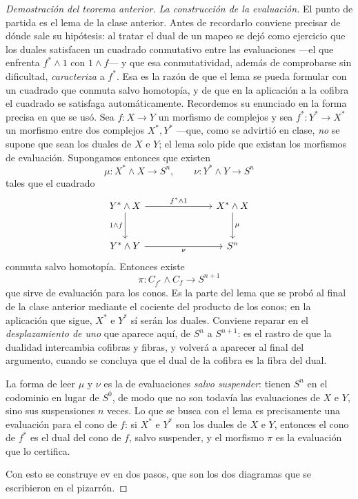 \begin{proof}[Demostración del teorema anterior]
\emph{La construcción de la evaluación.} El punto de partida es el lema de la clase anterior. Antes de recordarlo conviene precisar de dónde sale su hipótesis: al tratar el dual de un mapeo se dejó como ejercicio que los duales satisfacen un cuadrado conmutativo entre las evaluaciones ---el que enfrenta $f^*\wedge1$ con $1\wedge f$--- y que esa conmutatividad, además de comprobarse sin dificultad, \emph{caracteriza} a $f^*$. Esa es la razón de que el lema se pueda formular con un cuadrado que conmuta salvo homotopía, y de que en la aplicación a la cofibra el cuadrado se satisfaga automáticamente. Recordemos su enunciado en la forma precisa en que se usó. Sea $f\colon X\to Y$ un morfismo de complejos y sea $f^*\colon Y^*\to X^*$ un morfismo entre dos complejos $X^*,Y^*$ ---que, como se advirtió en clase, \emph{no} se supone que sean los duales de $X$ e $Y$; el lema solo pide que existan los morfismos de evaluación. Supongamos entonces que existen
\[
\mu\colon X^*\wedge X\longrightarrow S^n ,
\qquad
\nu\colon Y^*\wedge Y\longrightarrow S^n
\]
tales que el cuadrado
\[
\begin{tikzcd}[column sep=7em, row sep=large]
Y^*\wedge X \arrow[r,"f^*\wedge1"] \arrow[d,"1\wedge f"'] & X^*\wedge X \arrow[d,"\mu"]\\
Y^*\wedge Y \arrow[r,"\nu"'] & S^n
\end{tikzcd}
\]
conmuta salvo homotopía. Entonces existe
\[
\pi\colon C_{f^*}\wedge C_f\longrightarrow S^{n+1}
\]
que sirve de evaluación para los conos. Es la parte del lema que se probó al final de la clase anterior mediante el cociente del producto de los conos; en la aplicación que sigue, $X^*$ e $Y^*$ sí serán los duales. Conviene reparar en el \emph{desplazamiento de uno} que aparece aquí, de $S^n$ a $S^{n+1}$: es el rastro de que la dualidad intercambia cofibras y fibras, y volverá a aparecer al final del argumento, cuando se concluya que el dual de la cofibra es la fibra del dual.

La forma de leer $\mu$ y $\nu$ es la de evaluaciones \emph{salvo suspender}: tienen $S^n$ en el codominio en lugar de $S^0$, de modo que no son todavía las evaluaciones de $X$ e $Y$, sino sus suspensiones $n$ veces. Lo que se busca con el lema es precisamente una evaluación para el cono de $f$: si $X^*$ e $Y^*$ son los duales de $X$ e $Y$, entonces el cono de $f^*$ es el dual del cono de $f$, salvo suspender, y el morfismo $\pi$ es la evaluación que lo certifica.

Con esto se construye $\mathrm{ev}$ en dos pasos, que son los dos diagramas que se escribieron en el pizarrón.


\end{proof}
